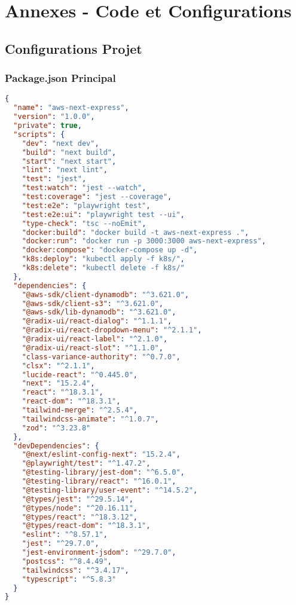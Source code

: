 \chapter{Annexes - Code et Configurations}

\section{Configurations Projet}

\subsection{Package.json Principal}

\begin{lstlisting}[language=JSON, caption=package.json]
{
  "name": "aws-next-express",
  "version": "1.0.0",
  "private": true,
  "scripts": {
    "dev": "next dev",
    "build": "next build",
    "start": "next start",
    "lint": "next lint",
    "test": "jest",
    "test:watch": "jest --watch",
    "test:coverage": "jest --coverage",
    "test:e2e": "playwright test",
    "test:e2e:ui": "playwright test --ui",
    "type-check": "tsc --noEmit",
    "docker:build": "docker build -t aws-next-express .",
    "docker:run": "docker run -p 3000:3000 aws-next-express",
    "docker:compose": "docker-compose up -d",
    "k8s:deploy": "kubectl apply -f k8s/",
    "k8s:delete": "kubectl delete -f k8s/"
  },
  "dependencies": {
    "@aws-sdk/client-dynamodb": "^3.621.0",
    "@aws-sdk/client-s3": "^3.621.0",
    "@aws-sdk/lib-dynamodb": "^3.621.0",
    "@radix-ui/react-dialog": "^1.1.1",
    "@radix-ui/react-dropdown-menu": "^2.1.1",
    "@radix-ui/react-label": "^2.1.0",
    "@radix-ui/react-slot": "^1.1.0",
    "class-variance-authority": "^0.7.0",
    "clsx": "^2.1.1",
    "lucide-react": "^0.445.0",
    "next": "15.2.4",
    "react": "^18.3.1",
    "react-dom": "^18.3.1",
    "tailwind-merge": "^2.5.4",
    "tailwindcss-animate": "^1.0.7",
    "zod": "^3.23.8"
  },
  "devDependencies": {
    "@next/eslint-config-next": "15.2.4",
    "@playwright/test": "^1.47.2",
    "@testing-library/jest-dom": "^6.5.0",
    "@testing-library/react": "^16.0.1",
    "@testing-library/user-event": "^14.5.2",
    "@types/jest": "^29.5.14",
    "@types/node": "^20.16.11",
    "@types/react": "^18.3.12",
    "@types/react-dom": "^18.3.1",
    "eslint": "^8.57.1",
    "jest": "^29.7.0",
    "jest-environment-jsdom": "^29.7.0",
    "postcss": "^8.4.49",
    "tailwindcss": "^3.4.17",
    "typescript": "^5.8.3"
  }
}
\end{lstlisting}


